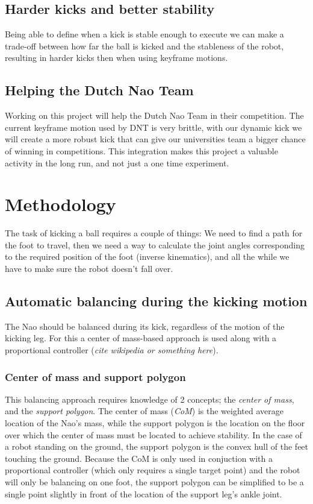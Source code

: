 \documentclass[a4paper]{article}
\begin{document}
\subsection{Harder kicks and better stability}
Being able to define when a kick is stable enough to execute we can make a
trade-off between how far the ball is kicked and the stableness of the
robot, resulting in harder kicks then when using keyframe motions.

\subsection{Helping the Dutch Nao Team}
 Working on this project will help the Dutch Nao Team in their competition. The
current keyframe motion used by DNT is very brittle, with our dynamic kick we will create a
more robust kick that can give our universities team a bigger chance of
winning in competitions. 
This integration makes this project a valuable activity in the long run, and not
just a one time experiment.

\section{Methodology}
The task of kicking a ball requires a couple of things: We need to find a path
for the foot to travel, then we need a way to calculate the joint angles
corresponding to the required position of the foot (inverse kinematics), and all
the while we have to make sure the robot doesn't fall over.

\subsection{Automatic balancing during the kicking motion}
The Nao should be balanced during its kick, regardless of the motion of the
kicking leg. For this a center of mass-based approach is used along with a
proportional controller (\emph{cite wikipedia or something here}).

\subsubsection{Center of mass and support polygon}
This balancing approach requires knowledge of 2 concepts; the \emph{center of mass},
and the \emph{support polygon}. The center of mass (\emph{CoM}) is the weighted average
location of the Nao’s mass, while the support polygon is the location on the
floor over which the center of mass must be located to achieve stability. In the
case of a robot standing on the ground, the support polygon is the convex hull
of the feet touching the ground. Because the CoM is only used in conjuction with
a proportional controller (which only requires a single target point) and the
robot will only be balancing on one foot, the support polygon can be simplified
to be a single point slightly in front of the location of the support leg's ankle
joint.
\end{document}
